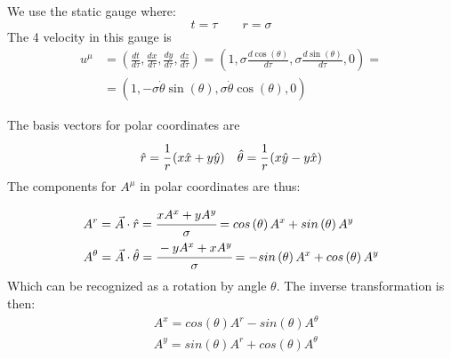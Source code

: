 \documentclass[11pt,a4paper]{article}
\begin{document}
We use the static gauge where:
\begin{equation}
\label{eq:staticqauge}
t=\tau \qquad r=\sigma
\end{equation}
The 4 velocity in this gauge is
\begin{align*}
u^{\mu}&=\left(\frac{dt}{d\tau},\frac{dx}{d\tau},\frac{dy}{d\tau},\frac{dz}{d\tau}\right)
=\left(1,\sigma\frac{d\cos\left(\theta\right)}{d\tau},\sigma\frac{d\sin\left(\theta\right)}{d\tau},0\right)=\\
&=\left(1,-\sigma\dot{\theta}\sin\left(\theta\right),\sigma\dot{\theta}\cos\left(\theta\right),0\right)
\end{align*}

The basis vectors for polar coordinates are
\begin{align*}
&\hat{r}=\cfrac{1}{r}\left(x\hat{x}+y\hat{y}\right) & \hat{\theta}=\cfrac{1}{r}\left(x\hat{y}-y\hat{x}\right)
\end{align*}
The components for $ A^{\mu} $ in polar coordinates are thus:

\begin{align*}
&A^{r}=\vec{A}\cdot\hat{r}=\cfrac{xA^{x}+yA^{y}}{\sigma}=cos\left(\theta\right)A^{x}+sin\left(\theta\right)A^{y}\\
&A^{\theta}=\vec{A}\cdot\hat{\theta}=\cfrac{-yA^{x}+xA^{y}}{\sigma}=-sin\left(\theta\right)A^{x}+cos\left(\theta\right)A^{y}
\end{align*}
Which can be recognized as a rotation by angle $\theta$. The inverse transformation is then:
\begin{align*}
&A^{x}=cos\left(\theta\right)A^{r}-sin\left(\theta\right)A^{\theta}\\
&A^{y}=sin\left(\theta\right)A^{r}+cos\left(\theta\right)A^{\theta}
\end{align*}
\end{document}
